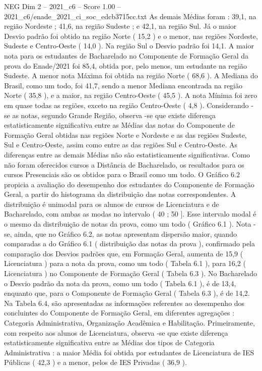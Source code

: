 \begin{textsample}{NEG Dim 2 – 2021\_c6 – Score 1.00 – 2021\_c6/enade\_2021\_ci\_soc\_edcb3715cc.txt}
As demais Médias foram : 39,1, na região Nordeste ; 41,6, na região Sudeste ; e 42,1, na região Sul.
Já o maior Desvio padrão foi obtido na região Norte ( 15,2 ) e o menor, nas regiões Nordeste, Sudeste e Centro-Oeste ( 14,0 ).
Na região Sul o Desvio padrão foi 14,1.
A maior nota para os estudantes de Bacharelado no Componente de Formação Geral da prova do Enade/2021 foi 85,4, obtida por, pelo menos, um estudante na região Sudeste.
A menor nota Máxima foi obtida na região Norte ( 68,6 ).
A Mediana do Brasil, como um todo, foi 41,7, sendo a menor Mediana encontrada na região Norte ( 35,8 ), e a maior, na região Centro-Oeste ( 45,5 ).
A nota Mínima foi zero em quase todas as regiões, exceto na região Centro-Oeste ( 4,8 ).
Considerando -se as notas, segundo Grande Região, observa -se que existe diferença estatisticamente significativa entre as Médias das notas do Componente de Formação Geral obtidas nas regiões Norte e Nordeste e as das regiões Sudeste, Sul e Centro-Oeste, assim como entre as das regiões Sul e Centro-Oeste.
As diferenças entre as demais Médias não são estatisticamente significativas.
Como não foram oferecidos cursos a Distância de Bacharelado, os resultados para os cursos Presenciais são os obtidos para o Brasil como um todo.
O Gráfico 6.2 propicia a avaliação do desempenho dos estudantes do Componente de Formação Geral, a partir do histograma da distribuição das notas correspondentes.
A distribuição é unimodal para os alunos de cursos de Licenciatura e de Bacharelado, com ambas as modas no intervalo ( 40 ; 50 ].
Esse intervalo modal é o mesmo da distribuição de notas da prova, como um todo ( Gráfico 6.1 ).
Nota -se, ainda, que no Gráfico 6.2, as notas apresentam dispersão maior, quando comparadas a do Gráfico 6.1 ( distribuição das notas da prova ), confirmado pela comparação dos Desvios padrões que, em Formação Geral, aumenta de 15,9 ( Licenciatura ) para a nota da prova, como um todo ( Tabela 6.1 ), para 16,2 ( Licenciatura ) no Componente de Formação Geral ( Tabela 6.3 ).
No Bacharelado o Desvio padrão da nota da prova, como um todo ( Tabela 6.1 ), é de 13,4, enquanto que, para o Componente de Formação Geral ( Tabela 6.3 ), é de 14,2.
Na Tabela 6.4, são apresentadas as informações referentes ao desempenho dos concluintes do Componente de Formação Geral, em diferentes agregações : Categoria Administrativa, Organização Acadêmica e Habilitação.
Primeiramente, com respeito aos alunos de Licenciatura, observa -se que existe diferença estatisticamente significativa entre as Médias dos tipos de Categoria Administrativa : a maior Média foi obtida por estudantes de Licenciatura de IES Públicas ( 42,3 ) e a menor, pelos de IES Privadas ( 36,9 ).

\end{textsample}
